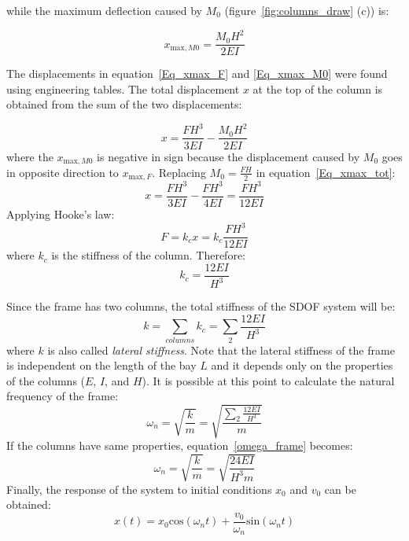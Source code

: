 \documentclass[12pt,letter]{article}
\begin{document}
while the maximum deflection caused by $M_0$ (figure~\ref{fig:columns_draw} (c)) is:

\begin{equation} \label{Eq_xmax_M0}
x_{\text{max},M0} = \frac{M_0H^2}{2EI}
\end{equation}

The displacements in equation~\ref{Eq_xmax_F} and \ref{Eq_xmax_M0} were found using engineering tables. The total displacement $x$ at the top of the column is obtained from the sum of the two displacements:

\begin{equation} \label{Eq_xmax_tot}
x =  \frac{FH^3}{3EI} - \frac{M_0H^2}{2EI}
\end{equation}
where the $x_{\text{max},M0}$ is negative in sign because the displacement caused by $M_0$ goes in opposite direction to $x_{\text{max},F}$. Replacing $M_0 = \frac{F H}{2}$ in equation~\ref{Eq_xmax_tot}:
\begin{equation}
x = \frac{FH^3}{3EI} - \frac{FH^3}{4EI} = \frac{FH^3}{12EI}
\end{equation}
Applying Hooke's law:
\begin{equation}
F = k_c x = k_c \frac{FH^3}{12EI}
\end{equation}
where $k_c$ is the stiffness of the column. Therefore:
\begin{equation}
k_c = \frac{12EI}{H^3}
\end{equation}

Since the frame has two columns, the total stiffness of the SDOF system will be:
\begin{equation}
k = \sum_{columns}^{} k_c = \sum_{2}^{} \frac{12EI} {H^3}
\end{equation}
where $k$ is also called \emph{lateral stiffness}. Note that the lateral stiffness of the frame is independent on the length of the bay $L$ and it depends only on the properties of the columns ($E$, $I$, and $H$). It is possible at this point to calculate the natural frequency of the frame:
\begin{equation} \label{omega_frame}
\omega_n = \sqrt{\frac{k}{m}} = \sqrt{\frac{\sum_{2}^{} \frac{12EI} {H^3}}{m}}
\end{equation}
If the columns have same properties, equation~\ref{omega_frame} becomes:
\begin{equation}
\omega_n = \sqrt{\frac{k}{m}} = \sqrt{\frac{24EI}{H^3m}}
\end{equation}
Finally, the response of the system to initial conditions $x_0$ and ${v_0}$ can be obtained:
\begin{equation}
x(t) = x_0\text{cos}(\omega_n t) + \frac{v_0}{\omega_n}\text{sin}(\omega_n t)
\end{equation}	
\end{document}
